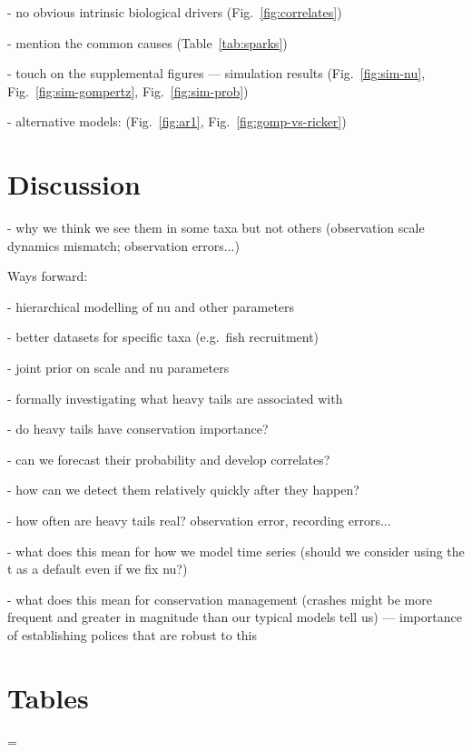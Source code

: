 \documentclass[11pt]{article}
\begin{document}
- no obvious intrinsic biological drivers (Fig.~\ref{fig:correlates})

- mention the common causes (Table~\ref{tab:sparks})

- touch on the supplemental figures --- simulation results (Fig.~\ref{fig:sim-nu}, Fig.~\ref{fig:sim-gompertz}, Fig.~\ref{fig:sim-prob})

- alternative models: (Fig.~\ref{fig:ar1}, Fig.~\ref{fig:gomp-vs-ricker})

\section{Discussion}

- why we think we see them in some taxa but not others (observation scale dynamics mismatch; observation errors...)

Ways forward:

- hierarchical modelling of nu and other parameters

- better datasets for specific taxa (e.g.\ fish recruitment)

- joint prior on scale and nu parameters

- formally investigating what heavy tails are associated with

- do heavy tails have conservation importance?

- can we forecast their probability and develop correlates?

- how can we detect them relatively quickly after they happen?

- how often are heavy tails real? observation error, recording errors...

- what does this mean for how we model time series (should we consider using the t as a default even if we fix nu?)

- what does this mean for conservation management (crashes might be more frequent and greater in magnitude than our typical models tell us) --- importance of establishing polices that are robust to this



\clearpage

\section{Tables}

\LTcapwidth=\textwidth
{}
\end{document}
